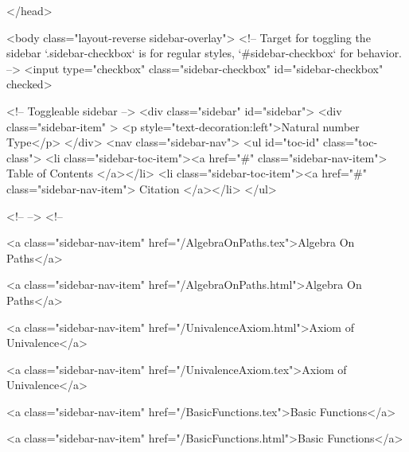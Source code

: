   
</head>




  <body class="layout-reverse sidebar-overlay">
    <!-- Target for toggling the sidebar `.sidebar-checkbox` is for regular
     styles, `#sidebar-checkbox` for behavior. -->
<input type="checkbox" class="sidebar-checkbox" id="sidebar-checkbox" checked>

<!-- Toggleable sidebar -->
<div class="sidebar" id="sidebar">
  <div class="sidebar-item" >
    <p style="text-decoration:left">Natural number Type</p>
  </div>
  <nav class="sidebar-nav">
    <ul id="toc-id" class="toc-class">
  <li class="sidebar-toc-item"><a href="#" class="sidebar-nav-item"> Table of Contents </a></li>
  <li class="sidebar-toc-item"><a href="#" class="sidebar-nav-item"> Citation </a></li>
</ul>


    <!--  -->
    <!-- 
      
    
      
    
      
    
      
        
      
    
      
        
          <a class="sidebar-nav-item" href="/AlgebraOnPaths.tex">Algebra On Paths</a>
        
      
    
      
        
          <a class="sidebar-nav-item" href="/AlgebraOnPaths.html">Algebra On Paths</a>
        
      
    
      
        
          <a class="sidebar-nav-item" href="/UnivalenceAxiom.html">Axiom of Univalence</a>
        
      
    
      
        
          <a class="sidebar-nav-item" href="/UnivalenceAxiom.tex">Axiom of Univalence</a>
        
      
    
      
        
          <a class="sidebar-nav-item" href="/BasicFunctions.tex">Basic Functions</a>
        
      
    
      
        
          <a class="sidebar-nav-item" href="/BasicFunctions.html">Basic Functions</a>
        
      
    
